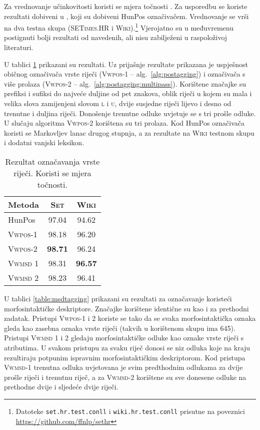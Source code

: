 Za vrednovanje učinkovitosti koristi se mjera točnosti . Za
usporedbu se koriste rezultati dobiveni u \citep{agic2013lemmatization}, koji su
dobiveni HunPos označivačem. Vrednovanje se vrši na dva testna skupa
(\textsc{SETimes.HR} i \textsc{Wiki}).\footnote{Datoteke
\texttt{set.hr.test.conll} i \texttt{wiki.hr.test.conll} prisutne na poveznici
\url{https://github.com/ffnlp/sethr}} Vjerojatno su u međuvremenu postignuti
bolji rezultati od navedenih, ali nisu zabilježeni u raspoloživoj literaturi.

U tablici \ref{table:postagging} prikazani su rezultati. Uz prijašnje rezultate
prikazana je uspješnost običnog označivača vrste riječi (\textsc{Vwpos-1} --
alg.~\ref{alg:postagging}) i označivača s više prolaza (\textsc{Vwpos-2} --
alg.~\ref{alg:postagging:multipass}). Korištene značajke su prefiksi i sufiksi
do najveće duljine od pet znakova, oblik riječi u kojem su mala i velika slova
zamijenjeni slovom \textsc{l} i \textsc{u}, dvije susjedne riječi lijevo i desno
od trenutne i duljina riječi. Donošenje trenutne odluke uvjetuje se s tri prošle
odluke. U slučaju algoritma \textsc{Vwpos-2} korištena su tri prolaza. Kod HunPos
označivača koristi se Markovljev lanac drugog stupnja, a za rezultate na
\textsc{Wiki} testnom skupu i dodatni vanjski leksikon.

\begin{table}
\centering
\caption[Rezultat označavanja vrste riječi.]{Rezultat označavanja vrste riječi.
Koristi se mjera točnosti.}
\label{table:postagging}
\begin{tabular}{|l|c|c|}
\hline
Metoda                               & \textsc{Set}   & \textsc{Wiki}  \\ \hline \hline
HunPos \citep{agic2013lemmatization} & 97.04          & 94.62          \\
\textsc{Vwpos-1}                     & 98.18          & 96.20          \\
\textsc{Vwpos-2}                     & \textbf{98.71} & 96.24          \\
\textsc{Vwmsd} 1                     & 98.31          & \textbf{96.57} \\
\textsc{Vwmsd} 2                     & 98.23          & 96.41          \\ \hline
\end{tabular}
\end{table}

U tablici \ref{table:msdtagging} prikazani su rezultati za označavanje koristeći
morfosintaktičke deskriptore. Značajke korištene identične su kao i za prethodni
zadatak. Pristupi \textsc{Vwpos-1} i \textsc{2} koriste se tako da se svaka
morfosintaktička oznaka gleda kao zasebna oznaka vrste riječi (takvih u
korištenom skupu ima 645). Pristupi \textsc{Vwmsd} 1 i 2 gledaju
morfosintaktičke odluke kao oznake vrste riječi s atributima. U svakom pristupu
za svaku riječ donosi se niz odluka koje na kraju rezultiraju potpunim ispravnim
morfosintaktičkim deskriptorom.  Kod pristupa \textsc{Vwmsd-1} trenutna odluka
uvjetovana je svim predthodnim odlukama za dvije prošle riječi i trenutnu riječ,
a za \textsc{Vwmsd-2} korištene su sve donesene odluke na prethodne dvije i
sljedeće dvije riječi.

